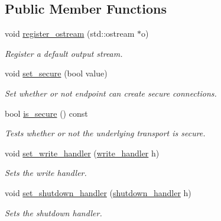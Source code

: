 \subsection*{Public Member Functions}
\begin{DoxyCompactItemize}
\item 
void \mbox{\hyperlink{classwebsocketpp_1_1transport_1_1iostream_1_1endpoint_ad6db3b10406e568befba8e00ae8b6ac4}{register\+\_\+ostream}} (std\+::ostream $\ast$o)
\begin{DoxyCompactList}\small\item\em Register a default output stream. \end{DoxyCompactList}\item 
void \mbox{\hyperlink{classwebsocketpp_1_1transport_1_1iostream_1_1endpoint_ae6488ca0ead1ce09a60e16a896162ad5}{set\+\_\+secure}} (bool value)
\begin{DoxyCompactList}\small\item\em Set whether or not endpoint can create secure connections. \end{DoxyCompactList}\item 
bool \mbox{\hyperlink{classwebsocketpp_1_1transport_1_1iostream_1_1endpoint_a42cfc1af42cd261b471bab53b85a2e2f}{is\+\_\+secure}} () const
\begin{DoxyCompactList}\small\item\em Tests whether or not the underlying transport is secure. \end{DoxyCompactList}\item 
void \mbox{\hyperlink{classwebsocketpp_1_1transport_1_1iostream_1_1endpoint_a1db266dab8c73f4aa2e8a3bdb95ec5a3}{set\+\_\+write\+\_\+handler}} (\mbox{\hyperlink{namespacewebsocketpp_1_1transport_1_1iostream_abc22b834c2d0c698d6c87e51d5bfad2c}{write\+\_\+handler}} h)
\begin{DoxyCompactList}\small\item\em Sets the write handler. \end{DoxyCompactList}\item 
void \mbox{\hyperlink{classwebsocketpp_1_1transport_1_1iostream_1_1endpoint_a2ba3290fe7688190c2e85143f52d88cc}{set\+\_\+shutdown\+\_\+handler}} (\mbox{\hyperlink{namespacewebsocketpp_1_1transport_1_1iostream_a3563ce2cca06b1466f7d76ecb8eb4a0b}{shutdown\+\_\+handler}} h)
\begin{DoxyCompactList}\small\item\em Sets the shutdown handler. \end{DoxyCompactList}\end{DoxyCompactItemize}
